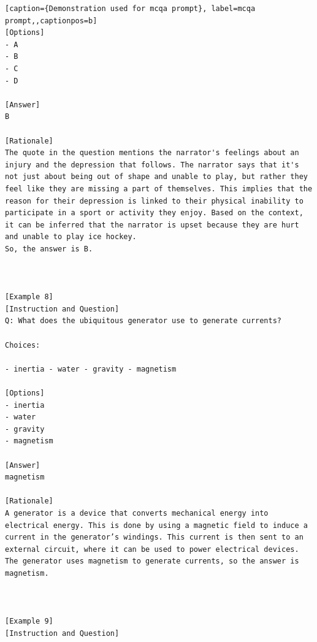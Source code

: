\begin{lstlisting}[caption={Demonstration used for mcqa prompt}, label=mcqa prompt,,captionpos=b]
[Options]
- A
- B
- C
- D

[Answer]
B

[Rationale]
The quote in the question mentions the narrator's feelings about an injury and the depression that follows. The narrator says that it's not just about being out of shape and unable to play, but rather they feel like they are missing a part of themselves. This implies that the reason for their depression is linked to their physical inability to participate in a sport or activity they enjoy. Based on the context, it can be inferred that the narrator is upset because they are hurt and unable to play ice hockey.
So, the answer is B.



[Example 8]
[Instruction and Question]
Q: What does the ubiquitous generator use to generate currents?

Choices:

- inertia - water - gravity - magnetism

[Options]
- inertia
- water
- gravity
- magnetism

[Answer]
magnetism

[Rationale]
A generator is a device that converts mechanical energy into electrical energy. This is done by using a magnetic field to induce a current in the generator’s windings. This current is then sent to an external circuit, where it can be used to power electrical devices. The generator uses magnetism to generate currents, so the answer is magnetism.



[Example 9]
[Instruction and Question]

    \end{lstlisting}



